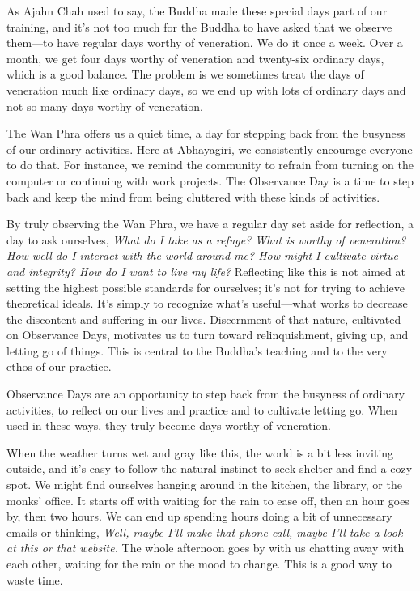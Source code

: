 As Ajahn Chah used to say, the Buddha made these special days part of 
our training, and it's not too much for the Buddha to have asked that 
we observe them---to have regular days worthy of veneration. We do it 
once a week. Over a month, we get four days worthy of veneration and 
twenty-six ordinary days, which is a good balance. The problem is we 
sometimes treat the days of veneration much like ordinary days, so we 
end up with lots of ordinary days and not so many days worthy of 
veneration.

The Wan Phra offers us a quiet time, a day for stepping back from the 
busyness of our ordinary activities. Here at Abhayagiri, we 
consistently encourage everyone to do that. For instance, we remind the 
community to refrain from turning on the computer or continuing with 
work projects. The Observance Day is a time to step back and keep the 
mind from being cluttered with these kinds of activities.

By truly observing the Wan Phra, we have a regular day set aside for 
reflection, a day to ask ourselves, \emph{What do I take as a refuge? 
What is worthy of veneration? How well do I interact with the world 
around me? How might I cultivate virtue and integrity? How do I want to 
live my life?} Reflecting like this is not aimed at setting the highest 
possible standards for ourselves; it's not for trying to achieve 
theoretical ideals. It's simply to recognize what's useful---what works 
to decrease the discontent and suffering in our lives. Discernment of 
that nature, cultivated on Observance Days, motivates us to turn toward 
relinquishment, giving up, and letting go of things. This is central to 
the Buddha's teaching and to the very ethos of our practice.

Observance Days are an opportunity to step back from the busyness of 
ordinary activities, to reflect on our lives and practice and to 
cultivate letting go. When used in these ways, they truly become days 
worthy of veneration.


When the weather turns wet and gray like this, the world is a bit less 
inviting outside, and it's easy to follow the natural instinct to seek 
shelter and find a cozy spot. We might find ourselves hanging around in 
the kitchen, the library, or the monks' office. It starts off with 
waiting for the rain to ease off, then an hour goes by, then two hours. 
We can end up spending hours doing a bit of unnecessary emails or 
thinking, \emph{Well, maybe I'll make that phone call, maybe I'll take 
a look at this or that website.} The whole afternoon goes by with us 
chatting away with each other, waiting for the rain or the mood to 
change. This is a good way to waste time.

